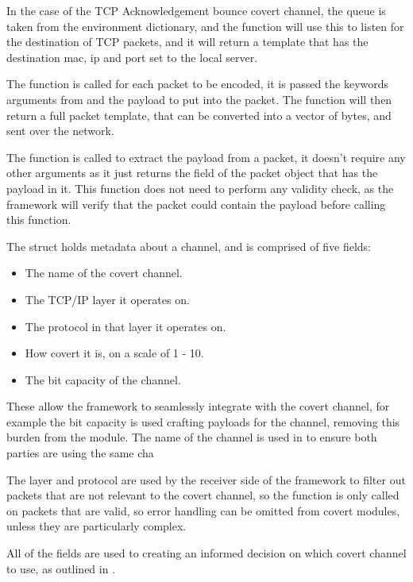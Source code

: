 In the case of the TCP Acknowledgement bounce covert channel, the queue is taken from the environment dictionary, and the  function will use this to listen for the destination of TCP packets, and it will return a template that has the destination mac, ip and port set to the local server.

The  function is called for each packet to be encoded, it is passed the keywords arguments from  and the payload to put into the packet. The function will then return a full packet template, that can be converted into a vector of bytes, and sent over the network.

The  function is called to extract the payload from a packet, it doesn't require any other arguments as it just returns the field of the packet object that has the payload in it. This function does not need to perform any validity check, as the framework will verify that the packet could contain the payload before calling this function.

The  struct holds metadata about a channel, and is comprised of five fields:
\begin{itemize}
    \item The name of the covert channel.
    \item The TCP/IP layer it operates on.
    \item The protocol in that layer it operates on.
    \item How covert it is, on a scale of 1 - 10.
    \item The bit capacity of the channel.
\end{itemize}
\label{itm:covert_method}

These allow the framework to seamlessly integrate with the covert channel, for example the bit capacity is used crafting payloads for the channel, removing this burden from the module. The name of the channel is used in  to ensure both parties are using the same cha

The layer and protocol are used by the receiver side of the framework to filter out packets that are not relevant to the covert channel, so the  function is only called on packets that are valid, so error handling can be omitted from covert modules, unless they are particularly complex.

All of the fields are used to creating an informed decision on which covert channel to use, as outlined in .

